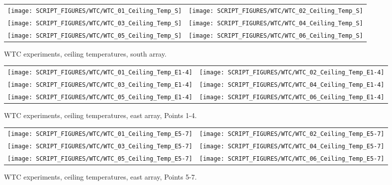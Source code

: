 \begin{figure}[p]
\begin{tabular*}{\textwidth}{l@{\extracolsep{\fill}}r}
\texttt{[image: SCRIPT\_FIGURES/WTC/WTC\_01\_Ceiling\_Temp\_S]} &
\texttt{[image: SCRIPT\_FIGURES/WTC/WTC\_02\_Ceiling\_Temp\_S]} \\
\texttt{[image: SCRIPT\_FIGURES/WTC/WTC\_03\_Ceiling\_Temp\_S]} &
\texttt{[image: SCRIPT\_FIGURES/WTC/WTC\_04\_Ceiling\_Temp\_S]} \\
\texttt{[image: SCRIPT\_FIGURES/WTC/WTC\_05\_Ceiling\_Temp\_S]} &
\texttt{[image: SCRIPT\_FIGURES/WTC/WTC\_06\_Ceiling\_Temp\_S]}
\end{tabular*}
\caption{WTC experiments, ceiling temperatures, south array.}
\label{NIST_WTC_Ceiling_S}
\end{figure}

\begin{figure}[p]
\begin{tabular*}{\textwidth}{l@{\extracolsep{\fill}}r}
\texttt{[image: SCRIPT\_FIGURES/WTC/WTC\_01\_Ceiling\_Temp\_E1-4]} &
\texttt{[image: SCRIPT\_FIGURES/WTC/WTC\_02\_Ceiling\_Temp\_E1-4]} \\
\texttt{[image: SCRIPT\_FIGURES/WTC/WTC\_03\_Ceiling\_Temp\_E1-4]} &
\texttt{[image: SCRIPT\_FIGURES/WTC/WTC\_04\_Ceiling\_Temp\_E1-4]} \\
\texttt{[image: SCRIPT\_FIGURES/WTC/WTC\_05\_Ceiling\_Temp\_E1-4]} &
\texttt{[image: SCRIPT\_FIGURES/WTC/WTC\_06\_Ceiling\_Temp\_E1-4]}
\end{tabular*}
\caption{WTC experiments, ceiling temperatures, east array, Points 1-4.}
\label{NIST_WTC_Ceiling_E1-4}
\end{figure}

\begin{figure}[p]
\begin{tabular*}{\textwidth}{l@{\extracolsep{\fill}}r}
\texttt{[image: SCRIPT\_FIGURES/WTC/WTC\_01\_Ceiling\_Temp\_E5-7]} &
\texttt{[image: SCRIPT\_FIGURES/WTC/WTC\_02\_Ceiling\_Temp\_E5-7]} \\
\texttt{[image: SCRIPT\_FIGURES/WTC/WTC\_03\_Ceiling\_Temp\_E5-7]} &
\texttt{[image: SCRIPT\_FIGURES/WTC/WTC\_04\_Ceiling\_Temp\_E5-7]} \\
\texttt{[image: SCRIPT\_FIGURES/WTC/WTC\_05\_Ceiling\_Temp\_E5-7]} &
\texttt{[image: SCRIPT\_FIGURES/WTC/WTC\_06\_Ceiling\_Temp\_E5-7]}
\end{tabular*}
\caption{WTC experiments, ceiling temperatures, east array, Points 5-7.}
\label{NIST_WTC_Ceiling_E5-7}
\end{figure}

